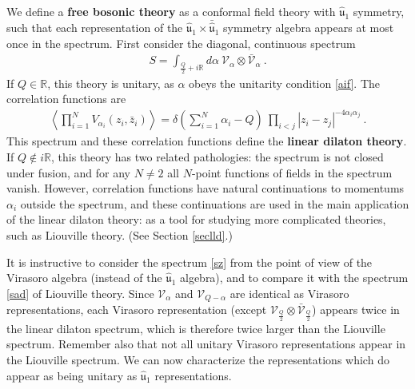 \documentclass[12pt, a4paper, notitlepage, twoside]{report}
\numberwithin{equation}{section}
\theoremstyle{break}
\begin{document}
We define a \textbf{\boldmath free bosonic theory} as a conformal field theory with $\hat{\mathfrak{u}}_1$ symmetry, such that each representation of the $\hat{\mathfrak{u}}_1 \times \bar{\hat{\mathfrak{u}}}_1$ symmetry algebra appears at most once in the spectrum.
First consider the diagonal, continuous spectrum 
\begin{align}
 \boxed{S = \int_{\frac{Q}{2}+i{\mathbb{R}}} d\alpha \ \mathcal{V}_\alpha \otimes \bar{\mathcal{V}}_\alpha}\ .
\label{sz}
\end{align}
If $Q\in {\mathbb{R}}$, this theory is unitary, as $\alpha$ obeys the unitarity condition \eqref{aif}.
The correlation functions are 
\begin{align}
 \left\langle \prod_{i=1}^N V_{\alpha_i}(z_i,\bar{z}_i)\right\rangle = \delta\left({\textstyle \sum}_{i=1}^N\alpha_i-Q\right)\ \prod_{i<j} |z_i-z_j|^{-4\alpha_i\alpha_j} \ .
\label{dpzz}
\end{align}
This spectrum and these correlation functions define the \textbf{\boldmath linear dilaton theory}. 
If $Q\notin i{\mathbb{R}}$, this theory has two related pathologies: the spectrum is not closed under fusion, and for any $N\neq 2$ all $N$-point functions of fields in the spectrum vanish.
However, correlation functions have natural continuations to momentums $\alpha_i$ outside the spectrum, and these continuations are used in the main application of the linear dilaton theory: 
as a tool for studying more complicated theories, such as Liouville theory. (See Section \ref{seclld}.) 

It is instructive to consider the spectrum \eqref{sz} from the point of view of the Virasoro algebra (instead of the $\hat{\mathfrak{u}}_1$ algebra), and to compare it with the spectrum \eqref{sad} of Liouville theory.
Since $\mathcal{V}_\alpha$ and $\mathcal{V}_{Q-\alpha}$ are identical as Virasoro representations, each Virasoro representation (except $\mathcal{V}_{\frac{Q}{2}}\otimes \bar{\mathcal{V}}_{\frac{Q}{2}}$) appears twice in the linear dilaton spectrum, which is therefore twice larger than the Liouville spectrum.
Remember also that not all unitary Virasoro representations appear in the Liouville spectrum.
We can now characterize
the representations which do appear as being unitary as $\hat{\mathfrak{u}}_1$ representations.
\end{document}
